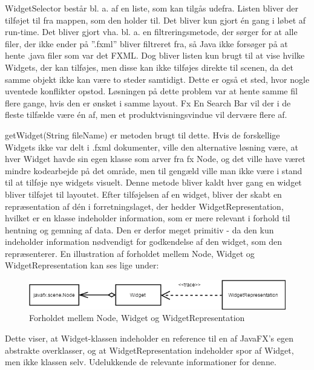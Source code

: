 WidgetSelector består bl. a. af en liste, som kan tilgås udefra. Listen bliver der tilføjet til fra mappen, som den holder til. Det bliver kun gjort én gang i løbet af run-time. Det bliver gjort vha. bl. a. en filtreringsmetode, der sørger for at alle filer, der ikke ender på ”.fxml” bliver filtreret fra, så Java ikke forsøger på at hente .java filer som var det FXML. Dog bliver listen kun brugt til at vise hvilke Widgets, der kan tilføjes, men disse kan ikke tilføjes direkte til scenen, da det samme objekt ikke kan være to steder samtidigt. Dette er også et sted, hvor nogle uventede konflikter opstod. Løsningen på dette problem var at hente samme fil flere gange, hvis den er ønsket i samme layout. Fx En Search Bar vil der i de fleste tilfælde være én af, men et produktvisningsvindue vil dervære flere af.

getWidget(String fileName) er metoden brugt til dette. Hvis de forskellige Widgets ikke var delt i .fxml dokumenter, ville den alternative løsning være, at hver Widget havde sin egen klasse som arver fra fx Node, og det ville have været mindre kodearbejde på det område, men til gengæld ville man ikke være i stand til at tilføje nye widgets visuelt.
Denne metode bliver kaldt hver gang en widget bliver tilføjet til layoutet.
Efter tilføjelsen af en widget, bliver der skabt en repræsentation af dén i forretningslaget, der hedder WidgetRepresentation, hvilket er en klasse indeholder information, som er mere relevant i forhold til hentning og gemning af data. Den er derfor meget primitiv - da den kun indeholder information nødvendigt for godkendelse af den widget, som den repræsenterer. En illustration af forholdet mellem Node, Widget og WidgetRepresentation kan ses lige under:
\begin{figure}[H]
  \includegraphics[width=\linewidth]{elaborationsdokumentet/figurer/relationWidgetNodeosv.png}
  \caption{Forholdet mellem Node, Widget og WidgetRepresentation}
  \label{fig:implementation-CMS1}
\end{figure}
Dette viser, at Widget-klassen indeholder en reference til en af JavaFX's egen abstrakte overklasser, og at WidgetRepresentation indeholder spor af Widget, men ikke klassen selv. Udelukkende de relevante informationer for denne. 

